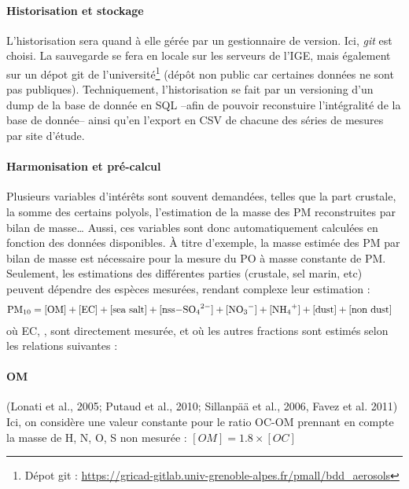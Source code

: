 \paragraph{Historisation et stockage}%
\label{par:historisation_et_stockage}

L'historisation sera quand à elle gérée par un gestionnaire de version. Ici, \textit{git}
est choisi. La sauvegarde se fera en locale sur les serveurs de l'IGE, mais également sur
un dépot git de l'université\footnote{Dépot git :
\url{https://gricad-gitlab.univ-grenoble-alpes.fr/pmall/bdd_aerosols}} (dépôt non public
car certaines données ne sont pas publiques).
Techniquement, l'historisation se fait par un versioning d'un dump de la base de donnée en
SQL --afin de pouvoir reconstuire l'intégralité de la base de donnée-- ainsi qu'en
l'export en CSV de chacune des séries de mesures par site d'étude.

\paragraph{Harmonisation et pré-calcul}%
\label{par:harmonisation_et_pré_calcul}

Plusieurs variables d'intérêts sont souvent demandées, telles que la part crustale, la
somme des certains polyols, l'estimation de la masse des PM reconstruites par bilan de
masse… Aussi, ces variables sont donc automatiquement calculées en fonction des données
disponibles. À titre d'exemple, la masse estimée des PM par bilan de masse est nécessaire
pour la mesure du PO à masse constante de PM. Seulement, les estimations des différentes
parties (crustale, sel marin, etc) peuvent dépendre des espèces mesurées, rendant complexe
leur estimation : 
\begin{align}
    \label{eq:pm_massbalance}
    \PMdix &= [\text{OM}] + [\text{EC}] + [\text{sea salt}] + [\ce{nss-SO_4^{2-}}] + [\ce{NO3-}] + [\ce{NH4+}] + [\text{dust}] + [\text{non dust}]
\end{align}
où EC, ,  sont directement mesurée, et où les autres fractions sont
estimés selon les relations suivantes :

\paragraph{OM} \autocite{putaudEuropean2010}(Lonati et al., 2005; Putaud et al., 2010; Sillanpää et al., 2006, Favez et al. 2011)
        Ici, on considère une valeur constante pour le ratio OC-OM prennant en compte la
        masse de H, N, O, S non mesurée :
        $[OM] = 1.8 \times [OC]$

